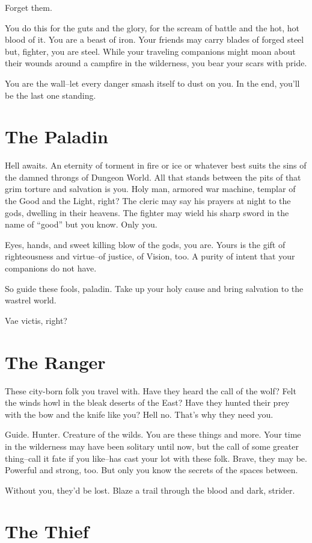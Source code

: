  Forget them.


 You do this for the guts and the glory, for the scream of battle and the hot, hot blood of it. You are a beast of iron. Your friends may carry blades of forged steel but, fighter, you are steel. While your traveling companions might moan about their wounds around a campfire in the wilderness, you bear your scars with pride.


 You are the wall--let every danger smash itself to dust on you. In the end, you'll be the last one standing.
\section*{The Paladin}


 Hell awaits. An eternity of torment in fire or ice or whatever best suits the sins of the damned throngs of Dungeon World. All that stands between the pits of that grim torture and salvation is you. Holy man, armored war machine, templar of the Good and the Light, right? The cleric may say his prayers at night to the gods, dwelling in their heavens. The fighter may wield his sharp sword in the name of ``good'' but you know. Only you.


 Eyes, hands, and sweet killing blow of the gods, you are. Yours is the gift of righteousness and virtue--of justice, of Vision, too. A purity of intent that your companions do not have.


 So guide these fools, paladin. Take up your holy cause and bring salvation to the wastrel world.


 Vae victis, right?
\section*{The Ranger}


 These city-born folk you travel with. Have they heard the call of the wolf? Felt the winds howl in the bleak deserts of the East? Have they hunted their prey with the bow and the knife like you? Hell no. That's why they need you.


 Guide. Hunter. Creature of the wilds. You are these things and more. Your time in the wilderness may have been solitary until now, but the call of some greater thing--call it fate if you like--has cast your lot with these folk. Brave, they may be. Powerful and strong, too. But only you know the secrets of the spaces between.


 Without you, they'd be lost. Blaze a trail through the blood and dark, strider.
\section*{The Thief}


